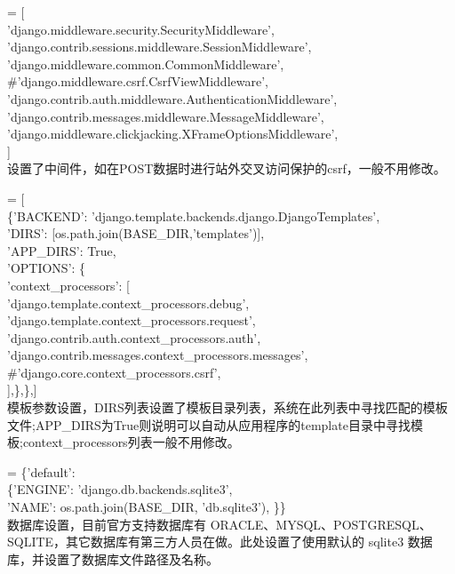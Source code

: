 \documentclass[a4paper]{ctexart}
\begin{document}
            {\color{blue}{MIDDLEWARE}} = [\\
    'django.middleware.security.SecurityMiddleware',\\
    'django.contrib.sessions.middleware.SessionMiddleware',\\
    'django.middleware.common.CommonMiddleware',\\
    \#'django.middleware.csrf.CsrfViewMiddleware',\\
    'django.contrib.auth.middleware.AuthenticationMiddleware',\\
    'django.contrib.messages.middleware.MessageMiddleware',\\
    'django.middleware.clickjacking.XFrameOptionsMiddleware',\\
            ]\\
            \indent 设置了中间件，如在POST数据时进行站外交叉访问保护的csrf，一般不用修改。

            {\color{blue}{TEMPLATES}} = [\\
              \{'BACKEND': 'django.template.backends.django.DjangoTemplates',\\
        'DIRS': [os.path.join(BASE\_DIR,'templates')],\\
        'APP\_DIRS': True,\\
        'OPTIONS': \{\\
            'context\_processors': [\\
                'django.template.context\_processors.debug',\\
                'django.template.context\_processors.request',\\
                'django.contrib.auth.context\_processors.auth',\\
                'django.contrib.messages.context\_processors.messages',\\
                \#'django.core.context\_processors.csrf',\\
            ],\},\},]\\
            \indent 模板参数设置，DIRS列表设置了模板目录列表，系统在此列表中寻找匹配的模板文件;APP\_DIRS为True则说明可以自动从应用程序的template目录中寻找模板;context\_processors列表一般不用修改。
                      
            {\color{blue}{DATABASES}} = \{'default': \\
              \{'ENGINE': 'django.db.backends.sqlite3',\\
                'NAME': os.path.join(BASE\_DIR, 'db.sqlite3'), \}\}\\
            \indent 数据库设置，目前官方支持数据库有 ORACLE、MYSQL、POSTGRESQL、SQLITE，其它数据库有第三方人员在做。此处设置了使用默认的 sqlite3 数据库，并设置了数据库文件路径及名称。
\end{document}

